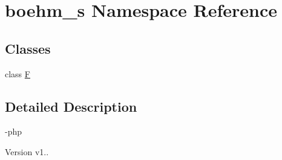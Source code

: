 \hypertarget{namespaceboehm__s}{}\section{boehm\+\_\+s Namespace Reference}
\label{namespaceboehm__s}
\subsection*{Classes}
\begin{DoxyCompactItemize}
\item 
class \hyperlink{classboehm__s_1_1F}{F}
\end{DoxyCompactItemize}


\subsection{Detailed Description}
-\/php \begin{DoxyVersion}{Version}
v1.. 
\end{DoxyVersion}
